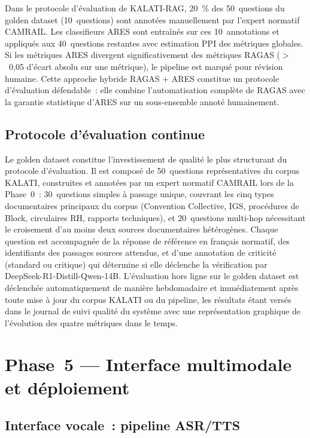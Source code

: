 \documentclass[12pt,a4paper]{report}
\begin{document}
Dans le protocole d'évaluation de KALATI-RAG, 20~\% des 50~questions du golden dataset
(10~questions) sont annotées manuellement par l'expert normatif CAMRAIL. Les classifieurs ARES
sont entraînés sur ces 10~annotations et appliqués aux 40~questions restantes avec estimation
PPI des métriques globales. Si les métriques ARES divergent significativement des métriques RAGAS
($>$~0,05 d'écart absolu sur une métrique), le pipeline est marqué pour révision humaine.
Cette approche hybride RAGAS + ARES constitue un protocole d'évaluation défendable~: elle
combine l'automatisation complète de RAGAS avec la garantie statistique d'ARES sur un
sous-ensemble annoté humainement.

\subsection{Protocole d'évaluation continue}

Le golden dataset constitue l'investissement de qualité le plus structurant du protocole
d'évaluation. Il est composé de 50~questions représentatives du corpus KALATI, construites et
annotées par un expert normatif CAMRAIL lors de la Phase~0~: 30~questions simples à passage
unique, couvrant les cinq types documentaires principaux du corpus (Convention Collective, IGS,
procédures de Block, circulaires RH, rapports techniques), et 20~questions multi-hop nécessitant
le croisement d'au moins deux sources documentaires hétérogènes. Chaque question est accompagnée
de la réponse de référence en français normatif, des identifiants des passages sources attendus,
et d'une annotation de criticité (standard ou critique) qui détermine si elle déclenche la
vérification par DeepSeek-R1-Distill-Qwen-14B. L'évaluation hors ligne sur le golden dataset
est déclenchée automatiquement de manière hebdomadaire et immédiatement après toute mise à jour
du corpus KALATI ou du pipeline, les résultats étant versés dans le journal de suivi qualité
du système avec une représentation graphique de l'évolution des quatre métriques dans le temps.

\section{Phase~5 --- Interface multimodale et déploiement}

\subsection{Interface vocale~: pipeline ASR/TTS}
\end{document}
